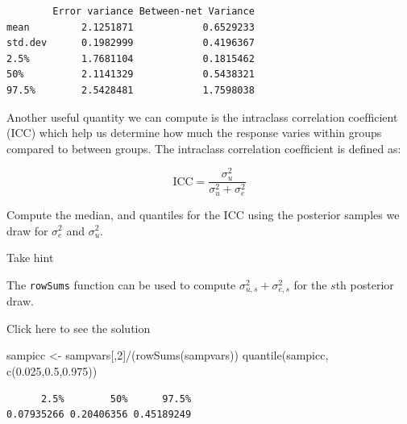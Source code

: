 \documentclass[
  letterpaper,
  DIV=11,
  numbers=noendperiod]{scrartcl}
\newenvironment{Shaded}{\begin{snugshade}}{\end{snugshade}}
\newcommand{\DecValTok}[1]{\textcolor[rgb]{0.68,0.00,0.00}{#1}}
\newcommand{\FloatTok}[1]{\textcolor[rgb]{0.68,0.00,0.00}{#1}}
\newcommand{\FunctionTok}[1]{\textcolor[rgb]{0.28,0.35,0.67}{#1}}
\newcommand{\NormalTok}[1]{\textcolor[rgb]{0.00,0.23,0.31}{#1}}
\newcommand{\OtherTok}[1]{\textcolor[rgb]{0.00,0.23,0.31}{#1}}
\newcommand{\SpecialCharTok}[1]{\textcolor[rgb]{0.37,0.37,0.37}{#1}}
\begin{document}
\begin{verbatim}
        Error variance Between-net Variance
mean         2.1251871            0.6529233
std.dev      0.1982999            0.4196367
2.5%         1.7681104            0.1815462
50%          2.1141329            0.5438321
97.5%        2.5428481            1.7598038
\end{verbatim}

\begin{tcolorbox}[enhanced jigsaw, coltitle=black, breakable, colbacktitle=quarto-callout-warning-color!10!white, bottomtitle=1mm, toprule=.15mm, colframe=quarto-callout-warning-color-frame, rightrule=.15mm, title={Task}, arc=.35mm, toptitle=1mm, opacityback=0, titlerule=0mm, left=2mm, bottomrule=.15mm, leftrule=.75mm, opacitybacktitle=0.6, colback=white]

Another useful quantity we can compute is the intraclass correlation
coefﬁcient (ICC) which help us determine how much the response varies
within groups compared to between groups. The intraclass correlation
coefﬁcient is defined as:

\[
\text{ICC} = \frac{\sigma^2_u}{\sigma^2_u + \sigma^2_e}
\]

Compute the median, and quantiles for the ICC using the posterior
samples we draw for \(\sigma^2_e\) and \(\sigma^2_u\).

Take hint

The \texttt{rowSums} function can be used to compute
\(\sigma^2_{u,s} + \sigma^2_{e,s}\) for the \(s\)th posterior draw.

Click here to see the solution

\begin{Shaded}
\begin{Highlighting}[]
\NormalTok{sampicc }\OtherTok{\textless{}{-}}\NormalTok{ sampvars[,}\DecValTok{2}\NormalTok{]}\SpecialCharTok{/}\NormalTok{(}\FunctionTok{rowSums}\NormalTok{(sampvars))}
\FunctionTok{quantile}\NormalTok{(sampicc, }\FunctionTok{c}\NormalTok{(}\FloatTok{0.025}\NormalTok{,}\FloatTok{0.5}\NormalTok{,}\FloatTok{0.975}\NormalTok{))}
\end{Highlighting}
\end{Shaded}

\begin{verbatim}
      2.5%        50%      97.5% 
0.07935266 0.20406356 0.45189249 
\end{verbatim}

\end{tcolorbox}
\end{document}
